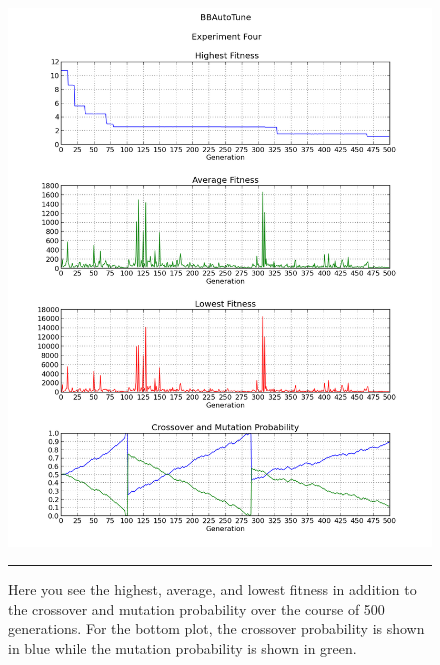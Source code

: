 \begin{figure}[htbp]
\centering
\includegraphics[width=5in]{../Figures/Chapter4/exp4_halcm.png}
\rule{35em}{0.5pt}
\caption[Experiment Four GA Metrics]{Here you see the highest, average, and lowest fitness in addition to the crossover and mutation probability over the course of 500 generations. For the bottom plot, the crossover probability is shown in blue while the mutation probability is shown in green.}
\label{fig:exp4_halcm}
\end{figure}

